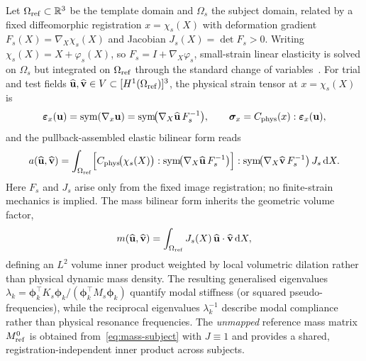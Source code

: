 \documentclass[11pt]{article}
\begin{document}
Let $\Omega_{\rm ref}\subset\mathbb R^3$ be the template domain and $\Omega_s$ the subject domain, related by a fixed diffeomorphic registration $x=\chi_s(X)$ with deformation gradient $F_s(X)=\nabla_X\chi_s(X)$ and Jacobian $J_s(X)=\det F_s>0$.
Writing $\chi_s(X)=X+\varphi_s(X)$, so $F_s=I+\nabla_X\varphi_s$, small-strain linear elasticity is solved on $\Omega_s$ but integrated on $\Omega_{\rm ref}$ through the standard change of variables~\citep{MarsdenHughes1983,BonetWood1997}.
For trial and test fields $\widehat{\mathbf u},\widehat{\mathbf v}\in V\subset[H^1(\Omega_{\rm ref})]^3$, the physical strain tensor at $x=\chi_s(X)$ is
\begin{equation}
\bm\varepsilon_x(\mathbf u)=\mathrm{sym}(\nabla_x \mathbf u)=\mathrm{sym}\!\big(\nabla_X \widehat{\mathbf u}\,F_s^{-1}\big),
\qquad
\bm\sigma_x=C_{\rm phys}(x):\bm\varepsilon_x(\mathbf u),
\end{equation}
and the pullback-assembled elastic bilinear form reads
\begin{equation}
a(\widehat{\mathbf u},\widehat{\mathbf v})
=\int_{\Omega_{\rm ref}}\!\Big[C_{\rm phys}\!\big(\chi_s(X)\big):\mathrm{sym}\!\big(\nabla_X \widehat{\mathbf u}\,F_s^{-1}\big)\Big]
:\mathrm{sym}\!\big(\nabla_X \widehat{\mathbf v}\,F_s^{-1}\big)\,J_s\,\mathrm dX.
\label{eq:pullback-bilinear}
\end{equation}
Here $F_s$ and $J_s$ arise only from the fixed image registration; no finite-strain mechanics is implied.
The mass bilinear form inherits the geometric volume factor,
\begin{equation}
m(\widehat{\mathbf u},\widehat{\mathbf v})
=\int_{\Omega_{\rm ref}} J_s(X)\,\widehat{\mathbf u}\cdot\widehat{\mathbf v}\,\mathrm dX,
\label{eq:mass-subject}
\end{equation}
defining an $L^2$ volume inner product weighted by local volumetric dilation rather than physical dynamic mass density.
The resulting generalised eigenvalues $\lambda_k = \boldsymbol\phi_k^\top K_s \boldsymbol\phi_k / (\boldsymbol\phi_k^\top M_s \boldsymbol\phi_k)$ quantify modal stiffness (or squared pseudo-frequencies), while the reciprocal eigenvalues $\lambda_k^{-1}$ describe modal compliance rather than physical resonance frequencies.
The \emph{unmapped} reference mass matrix $M_{\rm ref}^{0}$ is obtained from~\eqref{eq:mass-subject} with $J\equiv 1$ and provides a shared, registration-independent inner product across subjects.
\end{document}
